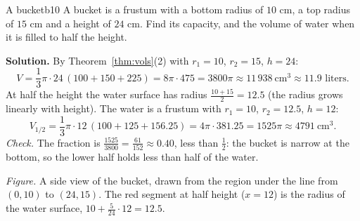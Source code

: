 \documentclass[11pt]{article}
\begin{document}
\begin{exmp}{A bucket}{b10}
A bucket is a frustum with a bottom radius of $10$ cm, a top radius of $15$ cm and a height of $24$ cm. Find its capacity, and the volume of water when it is filled to half the height.

\textbf{Solution.} By Theorem~\ref{thm:vols}(2) with $r_1=10$, $r_2=15$, $h=24$:
\[
V=\frac13\pi\cdot24\,(100+150+225)=8\pi\cdot475=3800\pi\approx11\,938\ \mathrm{cm}^3\approx11.9\text{ liters}.
\]
At half the height the water surface has radius $\frac{10+15}2=12.5$ (the radius grows linearly with height). The water is a frustum with $r_1=10$, $r_2=12.5$, $h=12$:
\[
V_{1/2}=\frac13\pi\cdot12\,(100+125+156.25)=4\pi\cdot381.25=1525\pi\approx4791\ \mathrm{cm}^3 .
\]
\emph{Check.} The fraction is $\frac{1525}{3800}=\frac{61}{152}\approx0.40$, less than $\frac12$: the bucket is narrow at the bottom, so the lower half holds less than half of the water.
\begin{center}
\par\small\emph{Figure.} A side view of the bucket, drawn from the region under the line from $(0,10)$ to $(24,15)$. The red segment at half height ($x=12$) is the radius of the water surface, $10+\frac{5}{24}\cdot12=12.5$.
\end{center}
\end{exmp}
\end{document}
